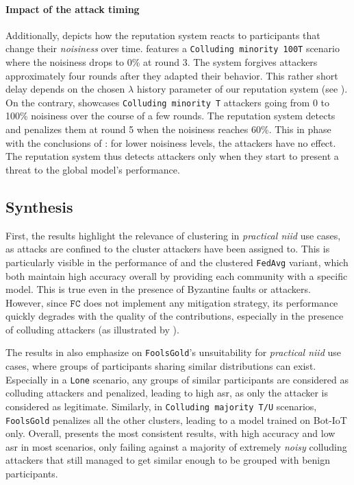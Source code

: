 \paragraph*{Impact of the attack timing\label{sec:radar.eval.results.flipping.timing}}

Additionally,  depicts how the reputation system reacts to participants that change their \emph{noisiness} over time. 
 features a \texttt{Colluding minority 100T} scenario where the noisiness drops to 0\% at round 3. 
The system forgives attackers approximately four rounds after they adapted their behavior.
This rather short delay depends on the chosen $\lambda$ history parameter of our reputation system (see ). 
On the contrary,  showcases \texttt{Colluding minority T} attackers going from 0 to 100\% noisiness over the course of a few rounds.
The reputation system detects and penalizes them at round 5 when the noisiness reaches 60\%. 
This in phase with the conclusions of : for lower noisiness levels, the attackers have no effect. 
The reputation system thus detects attackers only when they start to present a threat to the global model's performance. 


\subsection{Synthesis\label{sec:radar.eval.results.synthesis}}

First, the results highlight the relevance of clustering in \emph{practical \gls{niid}} use cases, as attacks are confined to the cluster attackers have been assigned to.
This is particularly visible in the performance of \thecontrib and the clustered \texttt{FedAvg} variant, which both maintain high accuracy overall by providing each community with a specific model.
This is true even in the presence of Byzantine faults or attackers.
However, since $\texttt{FC}$ does not implement any mitigation strategy, its performance quickly degrades with the quality of the contributions, especially in the presence of colluding attackers (as illustrated by ).

The results in  also emphasize on \texttt{FoolsGold}'s unsuitability for \emph{practical \gls{niid}} use cases, where groups of participants sharing similar distributions can exist.
Especially in a \texttt{Lone} scenario, any groups of similar participants are considered as colluding attackers and penalized, leading to high \gls{asr}, as only the attacker is considered as legitimate.
Similarly, in \texttt{Colluding majority T/U} scenarios, \texttt{FoolsGold} penalizes all the other clusters, leading to a model trained on Bot-IoT only.
Overall, \thecontrib presents the most consistent results, with high accuracy and low \gls{asr} in most scenarios, only failing against a majority of extremely \emph{noisy} colluding attackers that still managed to get similar enough to be grouped with benign participants.

